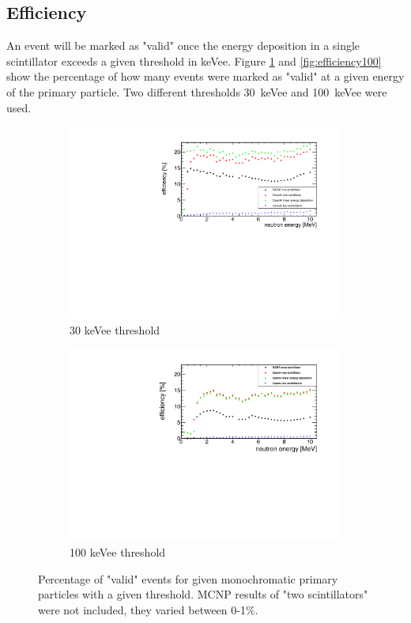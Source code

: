 \documentclass[12pt]{article}
\begin{document}
\subsection{Efficiency}

An event will be marked as "valid" once the energy deposition in a single scintillator exceeds a given threshold in keVee.  Figure \ref{fig:efficiency30} and \ref{fig:efficiency100} show the percentage of how many events were marked as "valid" at a given energy of the primary particle. Two different thresholds \SI{30}{keVee} and \SI{100}{keVee} were used.

 \begin{figure}[H]
 	\begin{subfigure}[t]{0.49\textwidth}
 		\includegraphics[width=\textwidth]{pics/efficiencyComplete30.pdf}
 		\caption{30 keVee threshold}
 	\end{subfigure}
 	\begin{subfigure}[t]{0.49\textwidth}
 		\includegraphics[width=\textwidth]{pics/efficiencyComplete100.pdf}
 		\caption{100 keVee threshold}
 	\end{subfigure}
 	\caption{Percentage of "valid" events for given monochromatic primary particles with a given threshold. MCNP results of "two scintillators" were not included, they varied between 0-1\%.}
 	\label{fig:efficiency30}
 \end{figure}
 
\end{document}
